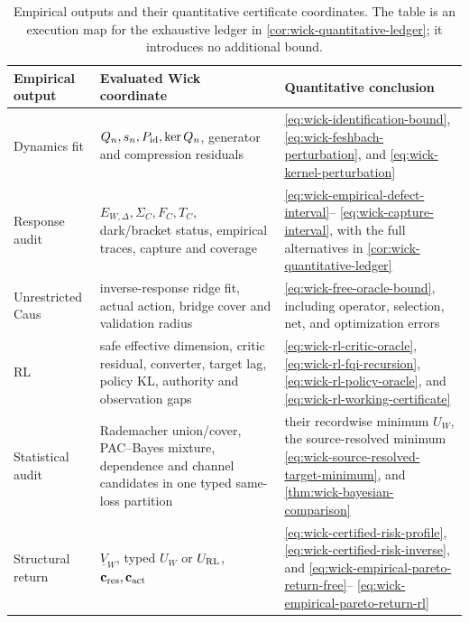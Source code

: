 \documentclass[11pt]{article}
\numberwithin{section}{part}
\theoremstyle{plain}
\theoremstyle{definition}
\theoremstyle{remark}
\begin{document}
\begin{table}[tbp]
\centering
\small
\begin{tabular}{@{}p{.20\linewidth}p{.35\linewidth}p{.35\linewidth}@{}}
\toprule
Empirical output & Evaluated Wick coordinate & Quantitative conclusion\\
\midrule
Dynamics fit
& \(Q_n,s_n,P_{\rm id},\ker Q_n\), generator and compression residuals
& \eqref{eq:wick-identification-bound},
  \eqref{eq:wick-feshbach-perturbation}, and
  \eqref{eq:wick-kernel-perturbation}\\
Response audit
& \(E_{W,\Delta},\Sigma_C,F_C,T_C\), dark/bracket status, empirical traces,
  capture and coverage
& \eqref{eq:wick-empirical-defect-interval}--
  \eqref{eq:wick-capture-interval}, with the full alternatives in
  \cref{cor:wick-quantitative-ledger}\\
Unrestricted Caus
& inverse-response ridge fit, actual action, bridge cover and validation
  radius
& \eqref{eq:wick-free-oracle-bound}, including operator, selection, net, and
  optimization errors\\
RL
& safe effective dimension, critic residual, converter, target lag, policy
  KL, authority and observation gaps
& \eqref{eq:wick-rl-critic-oracle},
  \eqref{eq:wick-rl-fqi-recursion},
  \eqref{eq:wick-rl-policy-oracle}, and
  \eqref{eq:wick-rl-working-certificate}\\
Statistical audit
& Rademacher union/cover, PAC--Bayes mixture, dependence and channel
  candidates in one typed same-loss partition
& their recordwise minimum \(U_W\), the source-resolved minimum
  \eqref{eq:wick-source-resolved-target-minimum}, and
  \cref{thm:wick-bayesian-comparison}\\
Structural return
& \(\underline V_W\), typed \(U_W\) or \(U_{\rm RL}\),
  \(\mathbf c_{\rm res},\mathbf c_{\rm act}\)
& \eqref{eq:wick-certified-risk-profile},
  \eqref{eq:wick-certified-risk-inverse}, and
  \eqref{eq:wick-empirical-pareto-return-free}--
  \eqref{eq:wick-empirical-pareto-return-rl}\\
\bottomrule
\end{tabular}
\caption{Empirical outputs and their quantitative certificate coordinates.
The table is an execution map for the exhaustive ledger in
\cref{cor:wick-quantitative-ledger}; it introduces no additional bound.}
\label{tab:wick-empirical-quantitative-ledger}
\end{table}
\end{document}
